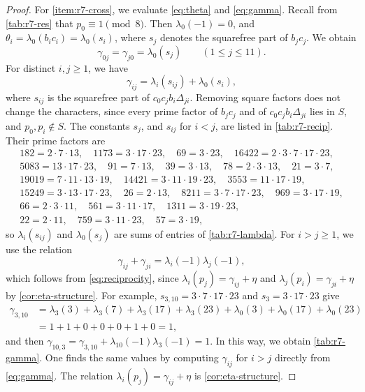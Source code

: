 \begin{proof}
For \ref{item:r7-cross}, we evaluate \eqref{eq:theta} and \eqref{eq:gamma}.
Recall from \cref{tab:r7-res} that $p_0\equiv1\pmod8$. Then $\lambda_0(-1)=0$,
and $\theta_i=\lambda_0(b_ic_i)=\lambda_0(s_i)$, where $s_j$ denotes the
squarefree part of $b_jc_j$. We obtain
\[
 \gamma_{0j}=\gamma_{j0}=\lambda_0(s_j)\qquad(1\le j\le11).
\]
For distinct $i,j\ge1$, we have
\[
 \gamma_{ij}=\lambda_i(s_{ij})+\lambda_0(s_i),
\]
where $s_{ij}$ is the squarefree part of $c_0c_jb_i\Delta_{ji}$. Removing
square factors does not change the characters, since every prime factor of
$b_jc_j$ and of $c_0c_jb_i\Delta_{ji}$ lies in $S$, and $p_0,p_i\notin S$.
The constants $s_j$, and $s_{ij}$ for $i<j$, are listed in
\cref{tab:r7-recip}. Their prime factors are
\[
\begin{gathered}
 182=2\cdot7\cdot13,\quad 1173=3\cdot17\cdot23,\quad 69=3\cdot23,\quad
 16422=2\cdot3\cdot7\cdot17\cdot23,\\
 5083=13\cdot17\cdot23,\quad 91=7\cdot13,\quad 39=3\cdot13,\quad
 78=2\cdot3\cdot13,\quad 21=3\cdot7,\\
 19019=7\cdot11\cdot13\cdot19,\quad 14421=3\cdot11\cdot19\cdot23,\quad
 3553=11\cdot17\cdot19,\\
 15249=3\cdot13\cdot17\cdot23,\quad 26=2\cdot13,\quad
 8211=3\cdot7\cdot17\cdot23,\quad 969=3\cdot17\cdot19,\\
 66=2\cdot3\cdot11,\quad 561=3\cdot11\cdot17,\quad 1311=3\cdot19\cdot23,\\
 22=2\cdot11,\quad 759=3\cdot11\cdot23,\quad 57=3\cdot19,
\end{gathered}
\]
so $\lambda_i(s_{ij})$ and $\lambda_0(s_j)$ are sums of entries of
\cref{tab:r7-lambda}. For $i>j\ge1$, we use the relation
\[
 \gamma_{ij}+\gamma_{ji}=\lambda_i(-1)\lambda_j(-1),
\]
which follows from \eqref{eq:reciprocity}, since
$\lambda_i(p_j)=\gamma_{ij}+\eta$ and $\lambda_j(p_i)=\gamma_{ji}+\eta$ by
\cref{cor:eta-structure}. For example, $s_{3,10}=3\cdot7\cdot17\cdot23$ and
$s_3=3\cdot17\cdot23$ give
\[
\begin{aligned}
 \gamma_{3,10}&=\lambda_3(3)+\lambda_3(7)+\lambda_3(17)+\lambda_3(23)
 +\lambda_0(3)+\lambda_0(17)+\lambda_0(23)\\
 &=1+1+0+0+0+1+0=1,
\end{aligned}
\]
and then $\gamma_{10,3}=\gamma_{3,10}+\lambda_{10}(-1)\lambda_3(-1)=1$.
In this way, we obtain \cref{tab:r7-gamma}. One finds the same values by
computing $\gamma_{ij}$ for $i>j$ directly from \eqref{eq:gamma}. The relation
$\lambda_i(p_j)=\gamma_{ij}+\eta$ is \cref{cor:eta-structure}.
\end{proof}

